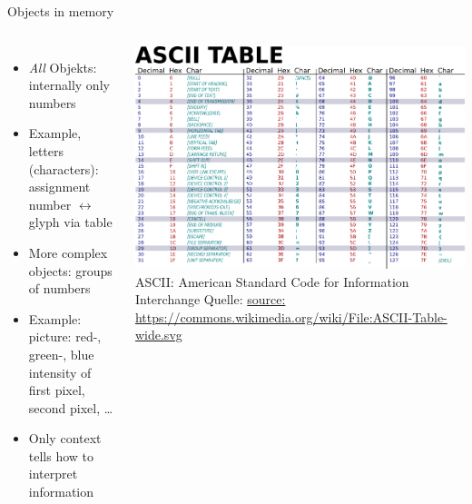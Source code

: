 
\begin{frame}[fragile]{Objects in memory}
%
\begin{columns}
	\begin{itemize}
	\item \emph{All} Objekts: internally only numbers
	\item Example, letters (characters): 
		assignment number $\leftrightarrow$ glyph via table
	\item More complex objects: groups of numbers
	\item Example: picture: red-, green-, blue intensity of first pixel, second pixel, \ldots
	\item Only context tells how to interpret information
	\end{itemize}
	\includegraphics[width=\linewidth]{./gfx/ASCII_table}\newline
	\tiny ASCII: American Standard Code for Information Interchange\newline
	Quelle: \url{source: https://commons.wikimedia.org/wiki/File:ASCII-Table-wide.svg}
\end{columns}
%
\end{frame}


